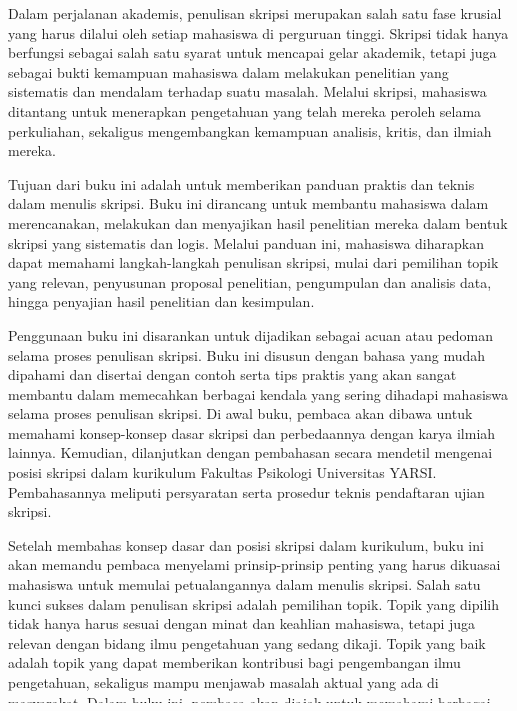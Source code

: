 \documentclass[
  indonesian,
  letterpaper,
  DIV=11,
  numbers=noendperiod]{scrreprt}
\begin{document}

Dalam perjalanan akademis, penulisan skripsi merupakan salah satu fase
krusial yang harus dilalui oleh setiap mahasiswa di perguruan tinggi.
Skripsi tidak hanya berfungsi sebagai salah satu syarat untuk mencapai
gelar akademik, tetapi juga sebagai bukti kemampuan mahasiswa dalam
melakukan penelitian yang sistematis dan mendalam terhadap suatu
masalah. Melalui skripsi, mahasiswa ditantang untuk menerapkan
pengetahuan yang telah mereka peroleh selama perkuliahan, sekaligus
mengembangkan kemampuan analisis, kritis, dan ilmiah mereka.

Tujuan dari buku ini adalah untuk memberikan panduan praktis dan teknis
dalam menulis skripsi. Buku ini dirancang untuk membantu mahasiswa dalam
merencanakan, melakukan dan menyajikan hasil penelitian mereka dalam
bentuk skripsi yang sistematis dan logis. Melalui panduan ini, mahasiswa
diharapkan dapat memahami langkah-langkah penulisan skripsi, mulai dari
pemilihan topik yang relevan, penyusunan proposal penelitian,
pengumpulan dan analisis data, hingga penyajian hasil penelitian dan
kesimpulan.

Penggunaan buku ini disarankan untuk dijadikan sebagai acuan atau
pedoman selama proses penulisan skripsi. Buku ini disusun dengan bahasa
yang mudah dipahami dan disertai dengan contoh serta tips praktis yang
akan sangat membantu dalam memecahkan berbagai kendala yang sering
dihadapi mahasiswa selama proses penulisan skripsi. Di awal buku,
pembaca akan dibawa untuk memahami konsep-konsep dasar skripsi dan
perbedaannya dengan karya ilmiah lainnya. Kemudian, dilanjutkan dengan
pembahasan secara mendetil mengenai posisi skripsi dalam kurikulum
Fakultas Psikologi Universitas YARSI. Pembahasannya meliputi persyaratan
serta prosedur teknis pendaftaran ujian skripsi.

Setelah membahas konsep dasar dan posisi skripsi dalam kurikulum, buku
ini akan memandu pembaca menyelami prinsip-prinsip penting yang harus
dikuasai mahasiswa untuk memulai petualangannya dalam menulis skripsi.
Salah satu kunci sukses dalam penulisan skripsi adalah pemilihan topik.
Topik yang dipilih tidak hanya harus sesuai dengan minat dan keahlian
mahasiswa, tetapi juga relevan dengan bidang ilmu pengetahuan yang
sedang dikaji. Topik yang baik adalah topik yang dapat memberikan
kontribusi bagi pengembangan ilmu pengetahuan, sekaligus mampu menjawab
masalah aktual yang ada di masyarakat. Dalam buku ini, pembaca akan
diajak untuk memahami berbagai pertimbangan dalam memilih topik skripsi,
serta strategi dalam mengembangkan ide penelitian menjadi sebuah
proposal penelitian yang solid dan meyakinkan.
\end{document}
